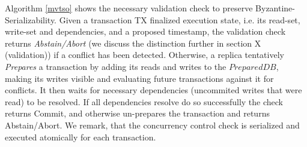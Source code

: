 Algorithm \ref{mvtso} shows the necessary validation check to preserve Byzantine-Serializability. 
Given a transaction TX finalized execution state, i.e. its read-set, write-set and dependencies, and a proposed timestamp, the validation check returns \textit{Abstain/Abort} (we discuss the distinction further in section X (validation)) if a conflict has been detected. Otherwise, a replica tentatively \textit{Prepares} a transaction by adding its reads and writes to the $PreparedDB$, making its writes visible and evaluating future transactions against it for conflicts. It then waits for necessary dependencies (uncommited writes that were read) to be resolved. 
If all dependencies resolve do so successfully the check returns Commit, and otherwise un-prepares the transaction and returns Abstain/Abort. We remark, that the concurrency control check is serialized and executed atomically for each transaction.


 





